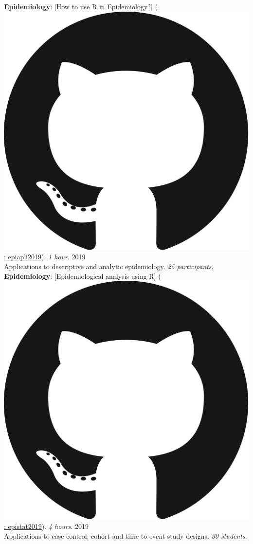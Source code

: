\documentclass[margin,line]{res}
\begin{document}
\begin{resume}
{\bf Epidemiology}: [How to use R in Epidemiology?] (\href{https://github.com/avallecam/epiapli2019}{\includegraphics[scale=.004]{../figure/gh_logo.png}: epiapli2019}). \textit{1 hour}. \hfill {2019}\\ Applications to descriptive and analytic epidemiology. \textit{25 participants}. \\[4pt] 
{\bf Epidemiology}: [Epidemiological analysis using R] (\href{https://github.com/avallecam/epistat2019}{\includegraphics[scale=.004]{../figure/gh_logo.png}: epistat2019}). \textit{4 hours}. \hfill {2019}\\ Applications to case-control, cohort and time to event study designs. \textit{30 students}. \\[4pt] 

\end{resume}
\end{document}
